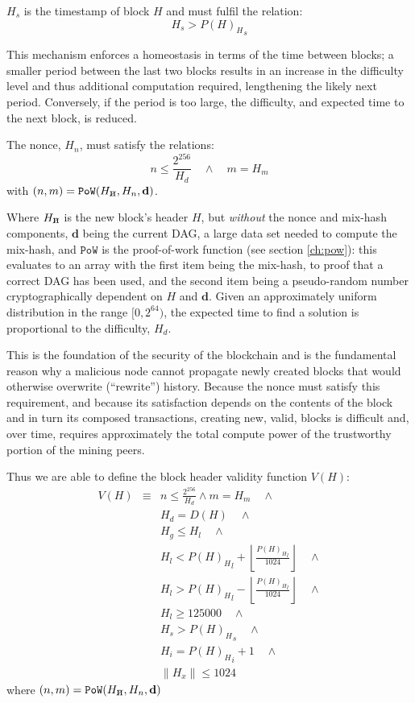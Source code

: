 \documentclass[9pt,oneside]{amsart}
\newcommand{\hcancel}[1]{%
    \tikz[baseline=(tocancel.base)]{
        \node[inner sep=0pt,outer sep=0pt] (tocancel) {#1};
        \draw[black] (tocancel.south west) -- (tocancel.north east);
    }%
}%
\begin{document}
\begin{multicols}{2}
$H_s$ is the timestamp of block $H$ and must fulfil the relation:
\begin{equation}
H_s > {P(H)_H}_s
\end{equation}

This mechanism enforces a homeostasis in terms of the time between blocks; a smaller period between the last two blocks results in an increase in the difficulty level and thus additional computation required, lengthening the likely next period. Conversely, if the period is too large, the difficulty, and expected time to the next block, is reduced.

The nonce, $H_n$, must satisfy the relations:
\begin{equation}
n \leqslant \frac{2^{256}}{H_d} \quad \wedge \quad m = H_m
\end{equation}
with $(n, m) = \mathtt{PoW}(H_{\hcancel{n}}, H_n, \mathbf{d})$.

Where $H_{\hcancel{n}}$ is the new block's header $H$, but \textit{without} the nonce and mix-hash components, $\mathbf{d}$ being the current DAG, a large data set needed to compute the mix-hash, and $\mathtt{PoW}$ is the proof-of-work function (see section \ref{ch:pow}): this evaluates to an array with the first item being the mix-hash, to proof that a correct DAG has been used, and the second item being a pseudo-random number cryptographically dependent on $H$ and $\mathbf{d}$. Given an approximately uniform distribution in the range $[0, 2^{64})$, the expected time to find a solution is proportional to the difficulty, $H_d$.

This is the foundation of the security of the blockchain and is the fundamental reason why a malicious node cannot propagate newly created blocks that would otherwise overwrite (``rewrite'') history. Because the nonce must satisfy this requirement, and because its satisfaction depends on the contents of the block and in turn its composed transactions, creating new, valid, blocks is difficult and, over time, requires approximately the total compute power of the trustworthy portion of the mining peers.

Thus we are able to define the block header validity function $V(H)$:
\begin{eqnarray}
V(H) & \equiv &  n \leqslant \frac{2^{256}}{H_d} \wedge m = H_m \quad \wedge \\
& & H_d = D(H) \quad \wedge \\
& & H_g \le H_l  \quad \wedge \\
& & H_l < {P(H)_H}_l + \left\lfloor\frac{{P(H)_H}_l}{1024}\right\rfloor  \quad \wedge \\
& & H_l > {P(H)_H}_l - \left\lfloor\frac{{P(H)_H}_l}{1024}\right\rfloor  \quad \wedge \\
& & H_l \geqslant 125000  \quad \wedge \\
& & H_s > {P(H)_H}_s \quad \wedge \\
& & H_i = {P(H)_H}_i +1 \quad \wedge \\
& & \lVert H_x \rVert \le 1024
\end{eqnarray}
where $(n, m) = \mathtt{PoW}(H_{\hcancel{n}}, H_n, \mathbf{d})$


\end{multicols}
\end{document}
